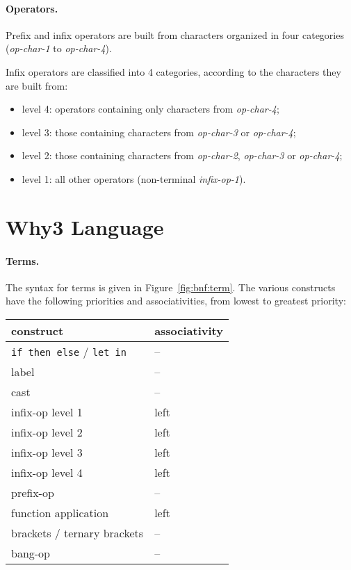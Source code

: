 \paragraph{Operators.}
Prefix and infix operators are built from characters organized in four
categories (\textsl{op-char-1} to \textsl{op-char-4}).
\begin{center}\framebox{}\end{center}
Infix operators are classified into 4 categories, according to the
characters they are built from:
\begin{itemize}
\item level 4: operators containing only characters from
\textit{op-char-4};
\item level 3: those containing
 characters from \textit{op-char-3} or \textit{op-char-4};
\item level 2: those containing
 characters from \textit{op-char-2}, \textit{op-char-3} or
 \textit{op-char-4};
\item level 1: all other operators (non-terminal \textit{infix-op-1}).
\end{itemize}


\section{Why3 Language}

\paragraph{Terms.}
The syntax for terms is given in Figure~\ref{fig:bnf:term}.
The various constructs have the following priorities and
associativities, from lowest to greatest priority:
\begin{center}
  \begin{tabular}{|l|l|}
    \hline
    construct & associativity \\
    \hline\hline
    \texttt{if then else} / \texttt{let in} & -- \\
    label & -- \\
    cast  & -- \\
    infix-op level 1 & left \\
    infix-op level 2 & left \\
    infix-op level 3 & left \\
    infix-op level 4 & left \\
    prefix-op     & --   \\
    function application & left \\
    brackets / ternary brackets & -- \\
    bang-op       & --   \\
    \hline
  \end{tabular}
\end{center}

